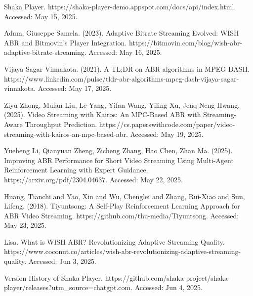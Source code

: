 \noindent [1] Shaka Player. https://shaka-player-demo.appspot.com/docs/api/index.html. Accessed: May 15, 2025.

\noindent [2] Adam, Giuseppe Samela. (2023). Adaptive Bitrate Streaming Evolved: WISH ABR and Bitmovin’s Player Integration. https://bitmovin.com/blog/wish-abr-adaptive-bitrate-streaming. Accessed: May 16, 2025.

\noindent [3] Vijaya Sagar Vinnakota. (2021). A TL;DR on ABR algorithms in MPEG DASH.
https://www.linkedin.com/pulse/tldr-abr-algorithms-mpeg-dash-vijaya-sagar-vinnakota. Accessed: May 17, 2025.

\noindent [4] Ziyu Zhong, Mufan Liu, Le Yang, Yifan Wang, Yiling Xu, Jenq-Neng Hwang. (2025). Video Streaming with Kairos: An MPC-Based ABR with Streaming-Aware Throughput Prediction. https://cs.paperswithcode.com/paper/video-streaming-with-kairos-an-mpc-based-abr. Accessed: May 19, 2025.

\noindent [5] Yueheng Li, Qianyuan Zheng, Zicheng Zhang, Hao Chen, Zhan Ma. (2025). Improving ABR Performance for Short Video Streaming Using
Multi-Agent Reinforcement Learning with Expert Guidance. https://arxiv.org/pdf/2304.04637. Accessed: May 22, 2025.

\noindent [6] Huang, Tianchi and Yao, Xin and Wu, Chenglei and Zhang, Rui-Xiao and Sun, Lifeng. (2018). Tiyuntsong: A Self-Play Reinforcement Learning Approach for ABR Video Streaming. https://github.com/thu-media/Tiyuntsong. Accessed: May 23, 2025.

\noindent [7] Lisa. What is WISH ABR? Revolutionizing Adaptive Streaming Quality.
https://www.coconut.co/articles/wish-abr-revolutionizing-adaptive-streaming-quality. Accessed: Jun 3, 2025.

\noindent [8] Version History of Shaka Player. https://github.com/shaka-project/shaka-player/releases?utm\_source=chatgpt.com. Accessed: Jun 4, 2025.

